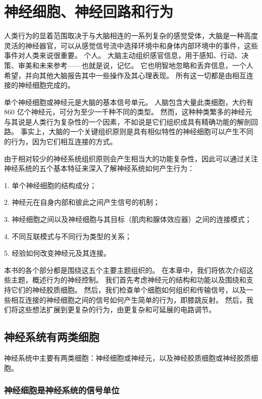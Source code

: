 \chapter{神经细胞、神经回路和行为} \label{chap:chap3}

人类行为的显着范围取决于与大脑相连的一系列复杂的感觉受体，大脑是一种高度灵活的神经器官，可以从感觉信号流中选择环境中和身体内部环境中的事件，这些事件对人类来说很重要。 个人。 
大脑主动组织感官信息，用于感知、行动、决策、审美和未来参考——也就是说，记忆。 
它也明智地忽略和丢弃信息，一个人希望，并向其他大脑报告其中一些操作及其心理表现。 
所有这一切都是由相互连接的神经细胞完成的。


单个神经细胞或神经元是大脑的基本信号单元。 
人脑包含大量此类细胞，大约有 860 亿个神经元，可分为至少一千种不同的类型。 
然而，这种种类繁多的神经元与其说是人类行为复杂性的一个因素，不如说是它们组织成具有精确功能的解剖回路。 
事实上，大脑的一个关键组织原则是具有相似特性的神经细胞可以产生不同的行为，因为它们相互连接的方式。


由于相对较少的神经系统组织原则会产生相当大的功能复杂性，因此可以通过关注神经系统的五个基本特征来深入了解神经系统如何产生行为：

1. 单个神经细胞的结构成分；

2. 神经元在自身内部和彼此之间产生信号的机制；

3. 神经细胞之间以及神经细胞与其目标（肌肉和腺体效应器）之间的连接模式；

4. 不同互联模式与不同行为类型的关系；

5. 经验如何改变神经元及其连接。

本书的各个部分都是围绕这五个主要主题组织的。 
在本章中，我们将依次介绍这些主题，概述行为的神经控制。 
我们首先考虑神经元的结构和功能以及围绕和支持它们的神经胶质细胞。 
然后，我们检查单个细胞如何组织和传输信号，以及一些相互连接的神经细胞之间的信号如何产生简单的行为，即膝跳反射。 
然后，我们将这些想法扩展到更复杂的行为，由更复杂和可延展的电路调节。


\section{神经系统有两类细胞}

神经系统中主要有两类细胞：神经细胞或神经元，以及神经胶质细胞或神经胶质细胞。

\subsection{神经细胞是神经系统的信号单位}

